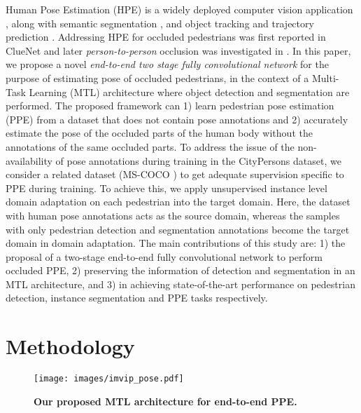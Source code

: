 \documentclass[a4paper,11pt]{article}
\begin{document}
Human Pose Estimation (HPE)
is a widely deployed computer vision application \cite{chen2020monocular}, along with semantic segmentation \cite{segdasvisapp19}, and object tracking and trajectory prediction \cite{sridevi2021object}. Addressing HPE for occluded pedestrians was first reported in ClueNet \cite{kishore2019cluenet} and later \textit{person-to-person} occlusion was investigated in \cite{das2020end}. In this paper, we propose a novel \textit{end-to-end two stage fully convolutional network} for the purpose of estimating pose of occluded pedestrians, in the context of a Multi-Task Learning (MTL) architecture where object detection and segmentation are performed. The proposed framework can 1) learn pedestrian pose estimation (PPE) from a dataset that does not contain pose annotations and 2) accurately estimate the pose of the occluded parts of the human body without the annotations of the same occluded parts. To address the issue of the non-availability of pose annotations during training in the CityPersons \cite{zhang2017citypersons} dataset, we consider a related dataset (MS-COCO \cite{lin2014microsoft}) to get adequate supervision specific to PPE during training. To achieve this, we apply unsupervised instance level domain adaptation on each pedestrian into the target domain. Here, the dataset with human pose annotations acts as the source domain, whereas the samples with only pedestrian detection and segmentation annotations become the target domain in domain adaptation. The main contributions of this study are: 1) the proposal of a two-stage end-to-end fully convolutional network to perform occluded PPE, 2) preserving the information of detection and segmentation in an MTL architecture, and 3) in achieving state-of-the-art performance on pedestrian detection, instance segmentation and PPE tasks respectively. 

 


\section{Methodology}
\begin{figure*}[]
    \centering
    \texttt{[image: images/imvip\_pose.pdf]}
    \vspace{-4mm}
    \caption{
    \textbf{Our proposed MTL architecture for end-to-end PPE.}
    }
    \label{fig:proposed_pose}
    \vspace{-0.5cm}
\end{figure*}
\end{document}

